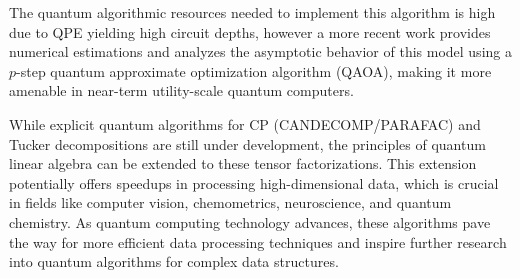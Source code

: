 The quantum algorithmic resources needed to implement this algorithm is high due to QPE yielding high circuit depths, however a more recent work \cite{zhou2024statistical} provides numerical estimations and analyzes the asymptotic behavior of this model using a $p$-step quantum approximate optimization algorithm (QAOA), making it more amenable in near-term utility-scale quantum computers. 


While explicit quantum algorithms for CP (CANDECOMP/PARAFAC) and Tucker decompositions are still under development, the principles of quantum linear algebra can be extended to these tensor factorizations. This extension potentially offers speedups in processing high-dimensional data, which is crucial in fields like computer vision, chemometrics, neuroscience, and quantum chemistry. As quantum computing technology advances, these algorithms pave the way for more efficient data processing techniques and inspire further research into quantum algorithms for complex data structures.

